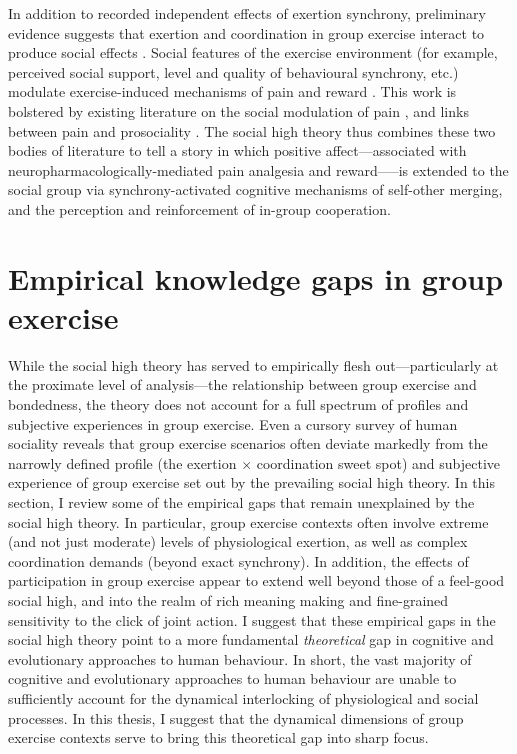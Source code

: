 \begin{CJK}{UTF8}{gbsn}
In addition to recorded independent effects of exertion synchrony,  preliminary evidence suggests that exertion and coordination in group exercise interact to produce social effects \citep{Jackson2018}.  Social features of the exercise environment (for example, perceived social support, level and quality of behavioural synchrony, etc.) modulate exercise-induced mechanisms of pain and reward \citep{Cohen2009,Sullivan2014,Tarr2015,Davis2015,Weinstein2016}. This work is bolstered by existing literature on the social modulation of pain \citep{Eisenberger2012a}, and links between pain and prosociality \citep{Bastian2014a}.  The social high theory thus combines these two bodies of literature to tell a story in which positive affect---associated with neuropharmacologically-mediated pain analgesia and reward—--is extended to the social group via synchrony-activated cognitive mechanisms of self-other merging, and the perception and reinforcement of in-group cooperation.


\section{Empirical knowledge gaps in group exercise\label{sect:empKnowGaps}}
While the social high theory has served to empirically flesh out---particularly at the proximate level of analysis---the relationship between group exercise and bondedness, the theory does not account for a full spectrum of profiles and subjective experiences in group exercise.  Even a cursory survey of human sociality reveals that group exercise scenarios often deviate markedly from the narrowly defined profile (the exertion $\times$ coordination sweet spot) and subjective experience of group exercise set out by the prevailing social high theory.  In this section, I review some of the empirical gaps that remain unexplained by the social high theory.  In particular, group exercise contexts often involve extreme (and not just moderate) levels of physiological exertion, as well as complex coordination demands (beyond exact synchrony).  In addition, the effects of participation in group exercise appear to extend well beyond those of a feel-good social high, and into the realm of rich meaning making and fine-grained sensitivity to the click of joint action.  I suggest that these empirical gaps in the social high theory point to a more fundamental \textit{theoretical} gap in cognitive and evolutionary approaches to human behaviour.  In short, the vast majority of cognitive and evolutionary approaches to human behaviour are unable to sufficiently account for the dynamical interlocking of physiological and social processes. In this thesis, I suggest that the dynamical dimensions of group exercise contexts serve to bring this theoretical gap into sharp focus.


\end{CJK}
